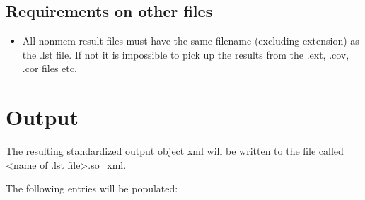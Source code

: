 \subsection{Requirements on other files}
\begin{itemize}
    \item All nonmem result files must have the same filename (excluding extension) as the .lst file. If not it is impossible to pick up the results from the .ext, .cov, .cor files etc.
\end{itemize}



\section{Output}

The resulting standardized output object xml will be written to the file called <name of .lst file>.so\_xml.

The following entries will be populated:

